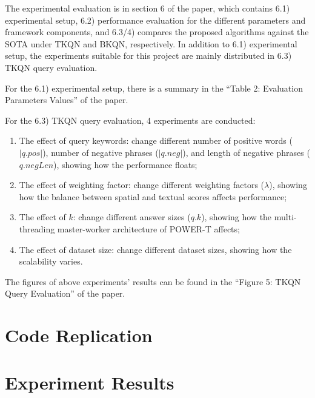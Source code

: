 \documentclass[]{IEEEphot}
\begin{document}
The experimental evaluation is in section 6 of the paper, which contains 6.1) experimental setup, 6.2) performance evaluation for the different parameters and framework components, and 6.3/4) compares the proposed algorithms against the SOTA under TKQN and BKQN, respectively. In addition to 6.1) experimental setup, the experiments suitable for this project are mainly distributed in 6.3) TKQN query evaluation.

For the 6.1) experimental setup, there is a summary in the “Table 2: Evaluation Parameters Values” of the paper.

For the 6.3) TKQN query evaluation, 4 experiments are conducted:

\begin{enumerate}
    \item The effect of query keywords: change different number of positive words ($|q.pos|$), number of negative phrases ($|q.neg|$), and length of negative phrases ($q.negLen$), showing how the performance floats;
    \item The effect of weighting factor: change different weighting factors ($\lambda$), showing how the balance between spatial and textual scores affects performance;
    \item The effect of $k$: change different answer sizes ($q.k$), showing how the multi-threading master-worker architecture of POWER-T affects;
    \item The effect of dataset size: change different dataset sizes, showing how the scalability varies.
\end{enumerate}

The figures of above experiments’ results can be found in the “Figure 5: TKQN Query Evaluation” of the paper.

\section{Code Replication}









\section{Experiment Results}
\end{document}
